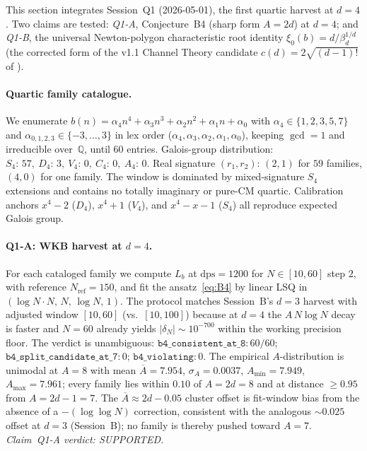 \documentclass[11pt,a4paper]{article}
\theoremstyle{definition}
\theoremstyle{remark}
\newcommand{\Q}{\mathbb{Q}}
\begin{document}
This section integrates Session~Q1 (2026-05-01), the first quartic
harvest at $d=4$. Two claims are tested: \emph{Q1-A}, Conjecture~B4
(sharp form $A=2d$) at $d=4$; and \emph{Q1-B}, the universal
Newton-polygon characteristic root identity
$\xi_0(b)=d/\beta_d^{1/d}$ (the corrected form of the v1.1 Channel
Theory candidate $c(d)=2\sqrt{(d-1)!}$ of
\cite{Papanokechi2026Channel}).

\paragraph{Quartic family catalogue.}
We enumerate
$b(n)=\alpha_{4}n^{4}+\alpha_{3}n^{3}+\alpha_{2}n^{2}+\alpha_{1}n+\alpha_{0}$
with $\alpha_{4}\in\{1,2,3,5,7\}$ and
$\alpha_{0,1,2,3}\in\{-3,\ldots,3\}$ in lex order
($\alpha_{4},\alpha_{3},\alpha_{2},\alpha_{1},\alpha_{0}$), keeping
$\gcd=1$ and irreducible over~$\Q$, until $60$ entries. Galois-group
distribution: $S_{4}{:}\,57,\ D_{4}{:}\,3,\ V_{4}{:}\,0,\ C_{4}{:}\,0,\ A_{4}{:}\,0$.
Real signature $(r_{1},r_{2})$: $(2,1)$ for $59$ families, $(4,0)$
for one family. The window is dominated by mixed-signature $S_{4}$
extensions and contains no totally imaginary or pure-CM quartic.
Calibration anchors $x^{4}-2$ ($D_{4}$), $x^{4}+1$ ($V_{4}$), and
$x^{4}-x-1$ ($S_{4}$) all reproduce expected Galois group.

\paragraph{Q1-A: WKB harvest at $d=4$.}
For each cataloged family we compute $L_{b}$ at $\mathrm{dps}=1200$
for $N\in[10,60]$ step $2$, with reference $N_{\mathrm{ref}}=150$,
and fit the ansatz~\eqref{eq:B4} by linear LSQ in
$(\log N\cdot N,\,N,\,\log N,\,1)$. The protocol matches Session~B's
$d=3$ harvest with adjusted window $[10,60]$ (vs.\ $[10,100]$)
because at $d=4$ the $A\,N\log N$ decay is faster and $N=60$ already
yields $|\delta_{N}|\sim 10^{-700}$ within the working precision floor.
The verdict is unambiguous: $\mathtt{b4\_consistent\_at\_8}: 60/60$;
$\mathtt{b4\_split\_candidate\_at\_7}: 0$;
$\mathtt{b4\_violating}: 0$. The empirical $A$-distribution is
unimodal at $A=8$ with mean $\overline{A}=7.954$,
$\sigma_{A}=0.0037$, $A_{\min}=7.949$, $A_{\max}=7.961$; every
family lies within $0.10$ of $A=2d=8$ and at distance $\ge 0.95$
from $A=2d-1=7$. The $\overline{A}\approx 2d-0.05$ cluster offset is
fit-window bias from the absence of a $-(\log\log N)$ correction,
consistent with the analogous $\sim\!0.025$ offset at $d=3$
(Session~B); no family is thereby pushed toward $A=7$.
\emph{Claim~Q1-A verdict: SUPPORTED}.
\end{document}
